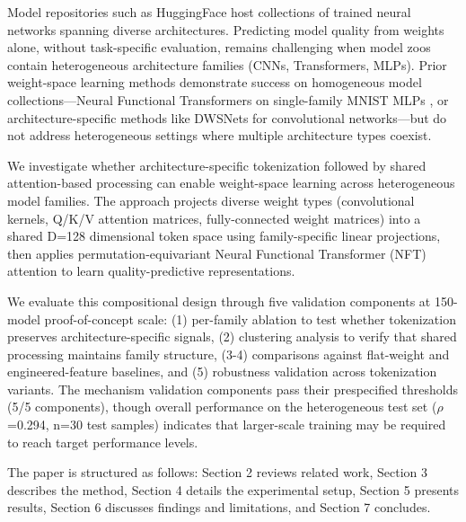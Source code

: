 
Model repositories such as HuggingFace host collections of trained neural networks spanning diverse architectures. Predicting model quality from weights alone, without task-specific evaluation, remains challenging when model zoos contain heterogeneous architecture families (CNNs, Transformers, MLPs). Prior weight-space learning methods demonstrate success on homogeneous model collections---Neural Functional Transformers on single-family MNIST MLPs \citep{zhou2023meta}, or architecture-specific methods like DWSNets for convolutional networks---but do not address heterogeneous settings where multiple architecture types coexist.

We investigate whether architecture-specific tokenization followed by shared attention-based processing can enable weight-space learning across heterogeneous model families. The approach projects diverse weight types (convolutional kernels, Q/K/V attention matrices, fully-connected weight matrices) into a shared D=128 dimensional token space using family-specific linear projections, then applies permutation-equivariant Neural Functional Transformer (NFT) attention to learn quality-predictive representations.

We evaluate this compositional design through five validation components at 150-model proof-of-concept scale: (1) per-family ablation to test whether tokenization preserves architecture-specific signals, (2) clustering analysis to verify that shared processing maintains family structure, (3-4) comparisons against flat-weight and engineered-feature baselines, and (5) robustness validation across tokenization variants. The mechanism validation components pass their prespecified thresholds (5/5 components), though overall performance on the heterogeneous test set ($\rho$=0.294, n=30 test samples) indicates that larger-scale training may be required to reach target performance levels.

The paper is structured as follows: Section 2 reviews related work, Section 3 describes the method, Section 4 details the experimental setup, Section 5 presents results, Section 6 discusses findings and limitations, and Section 7 concludes.
